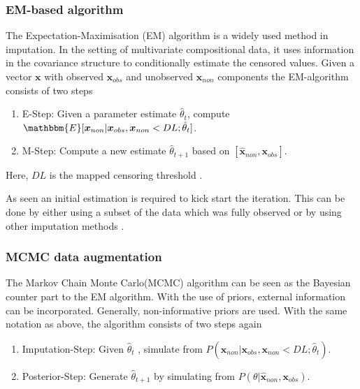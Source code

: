 \subsubsection{EM-based algorithm}
\label{sec:EM Algorithm}

The Expectation-Maximisation (EM) algorithm \cite{Dempster:1977} is a widely used method in imputation. In the setting of multivariate compositional data, it uses information in the covariance structure to conditionally estimate the censored values. Given a vector $\bm{x}$ with observed $\bm{x}_{obs}$ and unobserved $\bm{x}_{non}$ components the EM-algorithm consists of two steps

\begin{enumerate}
	\item E-Step: Given a parameter estimate $\hat{\theta}_t$, compute $\mathbbm{E}[\bm{x}_{non}|\bm{x}_{obs},\bm{x}_{non} < DL; \hat{\theta}_t]$.
	\item M-Step: Compute a new estimate $\hat{\theta}_{t+1}$ based on $[\hat{\bm{x}}_{non},\bm{x}_{obs}]$.
\end{enumerate}

Here, $DL$ is the mapped censoring threshold \cite{Palarea-Albaladejo:2015}.

As seen an initial estimation is required to kick start the iteration. This can be done by either using a subset of the data which was fully observed or by using other imputation methods \cite{Palarea-Albaladejo:2015}. 


\subsubsection{MCMC data augmentation}
\label{sec:MCMC data augmentation}

The Markov Chain Monte Carlo(MCMC) algorithm can be seen as the Bayesian counter part to the EM algorithm. With the use of priors, external information can be incorporated. Generally, non-informative priors are used. With the same notation as above, the algorithm consists of two steps again

\begin{enumerate}
	\item Imputation-Step: Given $\hat{\theta}_t$ , simulate from $P(\bm{x}_{non}|\bm{x}_{obs},\bm{x}_{non} < DL; \hat{\theta}_t)$.
	\item Posterior-Step: Generate $\hat{\theta}_{t+1}$ by simulating from $P(\theta|\hat{\bm{x}}_{non},\bm{x}_{obs})$. 
\end{enumerate}

